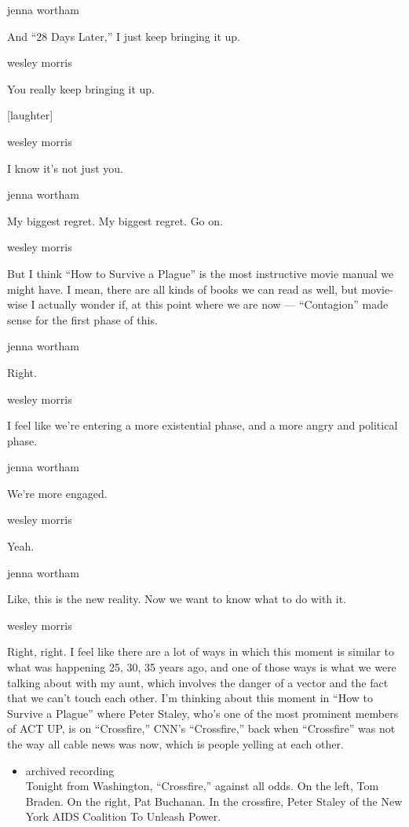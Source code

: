 jenna wortham

And ``28 Days Later,'' I just keep bringing it up.

wesley morris

You really keep bringing it up.

{[}laughter{]}

wesley morris

I know it's not just you.

jenna wortham

My biggest regret. My biggest regret. Go on.

wesley morris

But I think ``How to Survive a Plague'' is the most instructive movie
manual we might have. I mean, there are all kinds of books we can read
as well, but movie-wise I actually wonder if, at this point where we are
now --- ``Contagion'' made sense for the first phase of this.

jenna wortham

Right.

wesley morris

I feel like we're entering a more existential phase, and a more angry
and political phase.

jenna wortham

We're more engaged.

wesley morris

Yeah.

jenna wortham

Like, this is the new reality. Now we want to know what to do with it.

wesley morris

Right, right. I feel like there are a lot of ways in which this moment
is similar to what was happening 25, 30, 35 years ago, and one of those
ways is what we were talking about with my aunt, which involves the
danger of a vector and the fact that we can't touch each other. I'm
thinking about this moment in ``How to Survive a Plague'' where Peter
Staley, who's one of the most prominent members of ACT UP, is on
``Crossfire,'' CNN's ``Crossfire,'' back when ``Crossfire'' was not the
way all cable news was now, which is people yelling at each other.

\begin{itemize}
\tightlist
\item
  archived recording\\
  Tonight from Washington, ``Crossfire,'' against all odds. On the left,
  Tom Braden. On the right, Pat Buchanan. In the crossfire, Peter Staley
  of the New York AIDS Coalition To Unleash Power.
\end{itemize}

